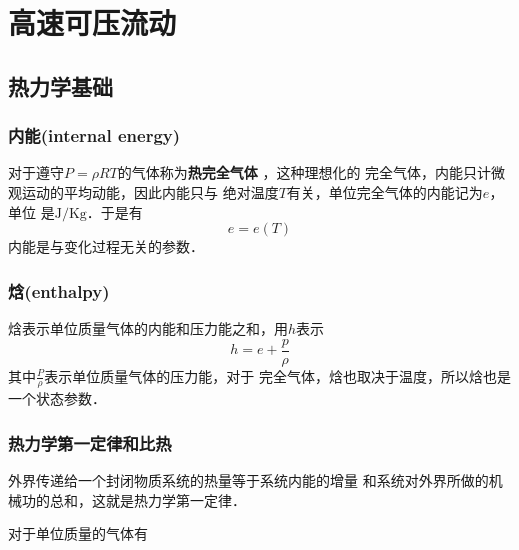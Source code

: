 
\chapter{高速可压流动}
\section{热力学基础}

\subsection{内能(internal energy)}
对于遵守$P=\rho RT$的气体称为{\bfseries 热完全气体}
，这种理想化的
完全气体，内能只计微观运动的平均动能，因此内能只与
绝对温度$T$有关，单位完全气体的内能记为$e$，单位
是$\mathrm{J /Kg}$．于是有
\[
	e=e(T)
\]
内能是与变化过程无关的参数．

\subsection{焓(enthalpy)}
焓表示单位质量气体的内能和压力能之和，用$h$表示
\[
	h=e+\frac{p}{\rho}
\]
其中$\frac{P}{\rho}$表示单位质量气体的压力能，对于
完全气体，焓也取决于温度，所以焓也是一个状态参数．

\subsection{热力学第一定律和比热}
外界传递给一个封闭物质系统的热量等于系统内能的增量
和系统对外界所做的机械功的总和，这就是热力学第一定律．

对于单位质量的气体有

